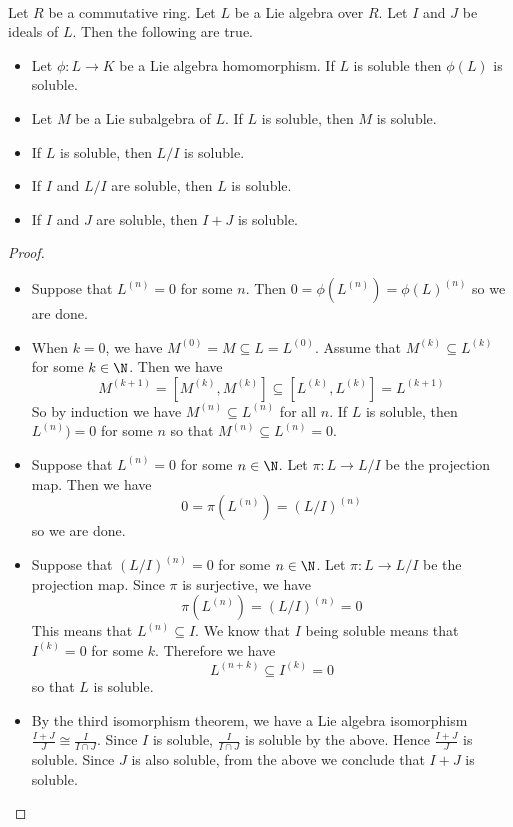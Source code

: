 \documentclass[a4paper]{article}
\begin{document}
\begin{prp}{}{}\\
Let $R$ be a commutative ring. Let $L$ be a Lie algebra over $R$. Let $I$ and $J$ be ideals of $L$. Then the following are true. 
\begin{itemize}
\item Let $\phi:L\to K$ be a Lie algebra homomorphism. If $L$ is soluble then $\phi(L)$ is soluble. 
\item Let $M$ be a Lie subalgebra of $L$. If $L$ is soluble, then $M$ is soluble. 
\item If $L$ is soluble, then $L/I$ is soluble. 
\item If $I$ and $L/I$ are soluble, then $L$ is soluble. 
\item If $I$ and $J$ are soluble, then $I+J$ is soluble. 
\end{itemize} 
\begin{proof}~\\
\begin{itemize}
\item Suppose that $L^{(n)}=0$ for some $n$. Then $0=\phi(L^{(n)})=\phi(L)^{(n)}$ so we are done. 
\item When $k=0$, we have $M^{(0)}=M\subseteq L=L^{(0)}$. Assume that $M^{(k)}\subseteq L^{(k)}$ for some $k\in\N$. Then we have $$M^{(k+1)}=[M^{(k)},M^{(k)}]\subseteq[L^{(k)},L^{(k)}]=L^{(k+1)}$$ So by induction we have $M^{(n)}\subseteq L^{(n)}$ for all $n$. If $L$ is soluble, then $L^{(n)})=0$ for some $n$ so that $M^{(n)}\subseteq L^{(n)}=0$. 
\item Suppose that $L^{(n)}=0$ for some $n\in\N$. Let $\pi:L\to L/I$ be the projection map. Then we have $$0=\pi(L^{(n)})=(L/I)^{(n)}$$ so we are done. 
\item Suppose that $(L/I)^{(n)}=0$ for some $n\in\N$. Let $\pi:L\to L/I$ be the projection map. Since $\pi$ is surjective, we have $$\pi(L^{(n)})=(L/I)^{(n)}=0$$ This means that $L^{(n)}\subseteq I$. We know that $I$ being soluble means that $I^{(k)}=0$ for some $k$. Therefore we have $$L^{(n+k)}\subseteq I^{(k)}=0$$ so that $L$ is soluble. 
\item By the third isomorphism theorem, we have a Lie algebra isomorphism $\frac{I+J}{J}\cong\frac{I}{I\cap J}$. Since $I$ is soluble, $\frac{I}{I\cap J}$ is soluble by the above. Hence $\frac{I+J}{J}$ is soluble. Since $J$ is also soluble, from the above we conclude that $I+J$ is soluble. 
\end{itemize}
\end{proof}
\end{prp}
\end{document}
